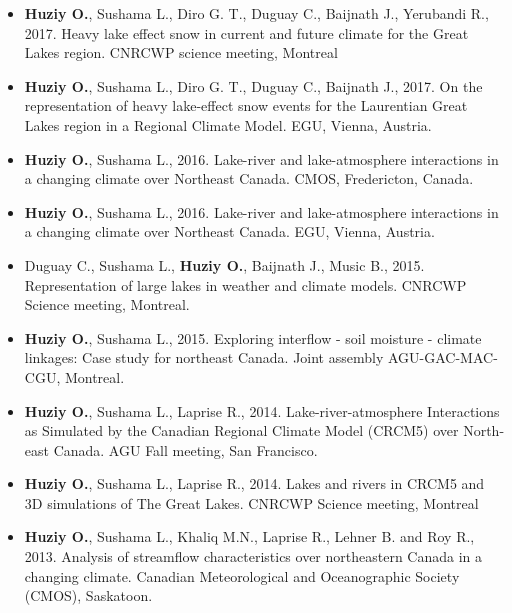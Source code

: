 
\vspace{\vertspace}

{
\renewcommand{\labelitemi}{}
\begin{itemize}


  \item \textbf{Huziy O.}, Sushama L., Diro G. T., Duguay C., Baijnath J., Yerubandi R., 2017.
  Heavy lake effect snow in current and future climate for the Great Lakes region. CNRCWP science meeting, Montreal

  \item \textbf{Huziy O.}, Sushama L., Diro G. T., Duguay C., Baijnath J., 2017.
  On the representation of heavy lake-effect snow events for the Laurentian Great
  Lakes region in a Regional Climate Model. EGU, Vienna, Austria.


  \item \textbf{Huziy O.}, Sushama L., 2016. Lake-river and lake-atmosphere
  interactions in a changing climate over Northeast Canada. CMOS, Fredericton, Canada.

  \item \textbf{Huziy O.}, Sushama L., 2016. Lake-river and lake-atmosphere
  interactions in a changing climate over Northeast Canada. EGU, Vienna, Austria.

   \item Duguay C., Sushama L., \textbf{Huziy O.}, Baijnath J., Music B., 2015.
   Representation of large lakes in weather and climate models. CNRCWP Science
   meeting, Montreal.

   \item \textbf{Huziy O.}, Sushama L., 2015. Exploring interflow - soil moisture - climate
   linkages: Case study for northeast Canada. Joint assembly AGU-GAC-MAC-CGU, Montreal.

   \item \textbf{Huziy O.}, Sushama L., Laprise R., 2014. Lake-river-atmosphere Interactions
   as Simulated by the Canadian Regional Climate Model (CRCM5) over North-east
   Canada. AGU Fall meeting, San Francisco.

   \item \textbf{Huziy O.}, Sushama L., Laprise R., 2014. Lakes and rivers in
   CRCM5 and 3D simulations of The Great Lakes. CNRCWP Science meeting, Montreal

   \item \textbf{Huziy O.}, Sushama L., Khaliq M.N., Laprise R., Lehner B. and Roy
    R., 2013. Analysis of streamflow characteristics over northeastern Canada in a
    changing climate. Canadian Meteorological and Oceanographic Society (CMOS),
    Saskatoon.


\end{itemize}}
